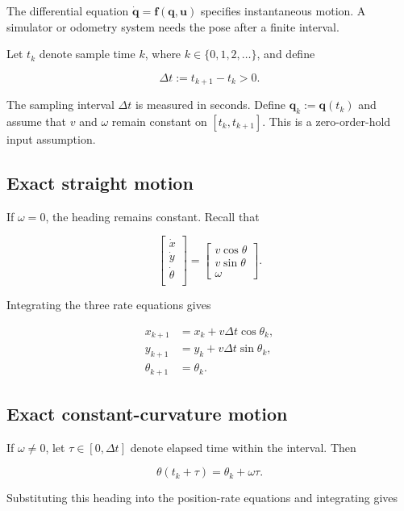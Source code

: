 \documentclass[
  australian,
  12pt,
  letterpaper,
  DIV=11,
  numbers=noendperiod,
  twoside]{scrreprt}
\begin{document}
The differential equation
\(\dot{\mathbf q}=\mathbf f(\mathbf q,\mathbf u)\) specifies
instantaneous motion. A simulator or odometry system needs the pose
after a finite interval.

Let \(t_k\) denote sample time \(k\), where \(k\in\{0,1,2,\ldots\}\),
and define

\[
\Delta t
\mathrel{:=}
t_{k+1}-t_k>0.
\]

The sampling interval \(\Delta t\) is measured in seconds. Define
\(\mathbf q_k\mathrel{:=}\mathbf q(t_k)\) and assume that \(v\) and
\(\omega\) remain constant on \([t_k,t_{k+1}]\). This is a
zero-order-hold input assumption.

\subsection{Exact straight motion}\label{exact-straight-motion}

If \(\omega=0\), the heading remains constant. Recall that

\[
\begin{bmatrix}
\dot x\\
\dot y \\
\dot \theta \\
\end{bmatrix}
=
\begin{bmatrix}
v\cos\theta\\
v\sin\theta \\
\omega
\end{bmatrix}.
\]

Integrating the three rate equations gives

\[
\boxed{
\begin{aligned}
x_{k+1}&=x_k+v\Delta t\cos\theta_k,\\
y_{k+1}&=y_k+v\Delta t\sin\theta_k,\\
\theta_{k+1}&=\theta_k.
\end{aligned}
}
\]

\subsection{Exact constant-curvature
motion}\label{exact-constant-curvature-motion}

If \(\omega\neq0\), let \(\tau\in[0,\Delta t]\) denote elapsed time
within the interval. Then

\[
\theta(t_k+\tau)=\theta_k+\omega\tau.
\]

Substituting this heading into the position-rate equations and
integrating gives
\end{document}
